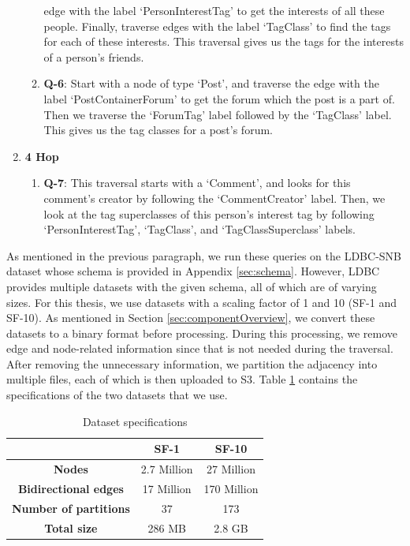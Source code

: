 \begin{enumerate}
\begin{enumerate}
                edge with the label `PersonInterestTag' to get the interests of all
                these people. Finally, traverse edges with the label `TagClass' to
                find the tags for each of these interests. This traversal gives us
                the tags for the interests of a person's friends.
            \item \textbf{Q-6}: Start with a node of type `Post', and traverse
                the edge with the label `PostContainerForum' to get the forum which
                the post is a part of. Then we traverse the `ForumTag' label
                followed by the `TagClass' label. This gives us the tag classes for
                a post's forum.
        \end{enumerate}
    \item \textbf{4 Hop}
        \begin{enumerate}
            \item \textbf{Q-7}: This traversal starts with a `Comment', and looks for
                this comment's creator by following the `CommentCreator' label.
                Then, we look at the tag superclasses of this person's interest
                tag by following `PersonInterestTag', `TagClass', and
                `TagClassSuperclass' labels.
        \end{enumerate}
\end{enumerate}

\medskip
As mentioned in the previous paragraph, we run these queries on the
LDBC-SNB\cite{angles2020ldbc} dataset
whose schema is provided in Appendix \ref{sec:schema}. However, LDBC provides
multiple datasets with the given schema, all of which are of varying sizes.
For this thesis, we use datasets with a scaling factor of 1 and 10 (SF-1 and
SF-10). As mentioned in Section \ref{sec:componentOverview}, we convert these
datasets to a binary format before processing. During this processing, we remove
edge and node-related information since that is not needed during the traversal.
After removing the unnecessary information, we partition the adjacency into
multiple files, each of which is then uploaded to S3.
Table \ref{table:dataSpecs} contains the specifications of the two datasets that
we use.


\begin{table}[h!]
 \centering
 \begin{tabular}{|c | c | c |} 
 \hline
  & SF-1 & SF-10 \\ [0.5ex] 
 \hline\hline
     \textbf{Nodes} & 2.7 Million & 27 Million \\ 
     \textbf{Bidirectional edges} & 17 Million & 170 Million \\
     \textbf{Number of partitions} & 37 & 173 \\
     \textbf{Total size} & 286 MB & 2.8 GB \\
 \hline
 \end{tabular}
 \caption{Dataset specifications}
 \label{table:dataSpecs}
\end{table}

